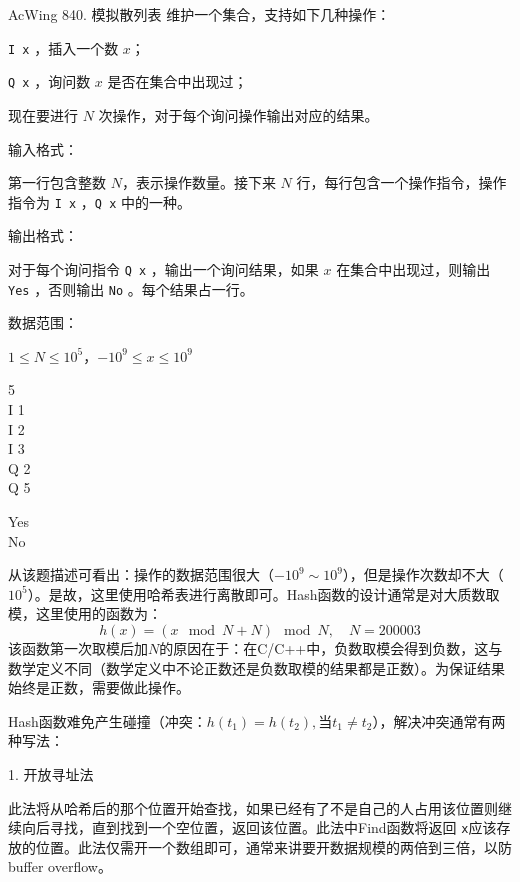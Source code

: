 \begin{titledbox}{AcWing 840. 模拟散列表}
维护一个集合，支持如下几种操作：

\lstinline{I x} ，插入一个数 $x$；

\lstinline{Q x} ，询问数 $x$ 是否在集合中出现过；

现在要进行 $N$ 次操作，对于每个询问操作输出对应的结果。

输入格式：

第一行包含整数 $N$，表示操作数量。接下来 $N$ 行，每行包含一个操作指令，操作指令为 \lstinline{I x} ，\lstinline{Q x}  中的一种。

输出格式：

对于每个询问指令 \lstinline{Q x} ，输出一个询问结果，如果 $x$ 在集合中出现过，则输出 \lstinline{Yes} ，否则输出 \lstinline{No} 。每个结果占一行。

数据范围：

$1 \le N \le 10^5$，$-10^9 \le x \le 10^9$

\begin{inputblock}
    5 \\
    I 1 \\
    I 2 \\
    I 3 \\
    Q 2 \\
    Q 5
\end{inputblock}
\begin{outputblock}
    Yes \\
    No
\end{outputblock}
\end{titledbox}

从该题描述可看出：操作的数据范围很大（$-10^9 \sim 10^9$），但是操作次数却不大（$10^5$）。是故，这里使用哈希表进行离散即可。Hash函数的设计通常是对大质数取模，这里使用的函数为：
\begin{equation*}
    h(x) = (x \mod N + N) \mod N, \quad N = 200003
\end{equation*}
该函数第一次取模后加$N$的原因在于：在C/C++中，负数取模会得到负数，这与数学定义不同（数学定义中不论正数还是负数取模的结果都是正数）。为保证结果始终是正数，需要做此操作。

Hash函数难免产生碰撞（冲突：$h(t_1) = h(t_2), \text{当} t_1 \neq t_2$），解决冲突通常有两种写法：

1. 开放寻址法

此法将从哈希后的那个位置开始查找，如果已经有了不是自己的人占用该位置则继续向后寻找，直到找到一个空位置，返回该位置。此法中Find函数将返回 \lstinline{x}应该存放的位置。此法仅需开一个数组即可，通常来讲要开数据规模的两倍到三倍，以防buffer overflow。

